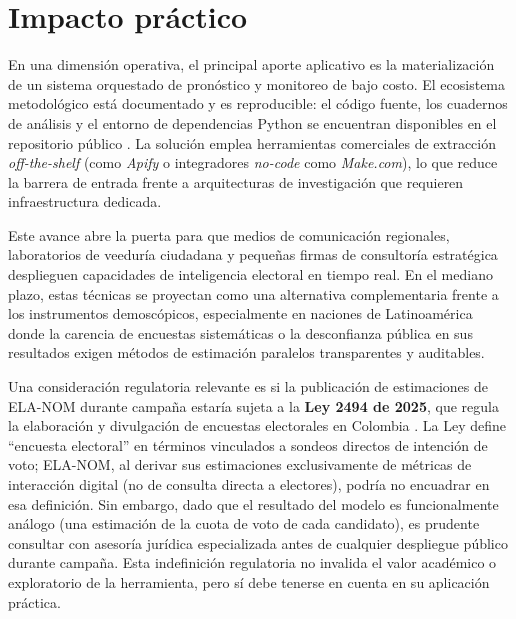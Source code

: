 \section{Impacto práctico}

En una dimensión operativa, el principal aporte aplicativo es la materialización de un sistema orquestado de pronóstico y monitoreo de bajo costo. El ecosistema metodológico está documentado y es reproducible: el código fuente, los cuadernos de análisis y el entorno de dependencias Python se encuentran disponibles en el repositorio público \parencite{sotelo2026elanom}. La solución emplea herramientas comerciales de extracción \textit{off-the-shelf} (como \textit{Apify} o integradores \textit{no-code} como \textit{Make.com}), lo que reduce la barrera de entrada frente a arquitecturas de investigación que requieren infraestructura dedicada.

Este avance abre la puerta para que medios de comunicación regionales, laboratorios de veeduría ciudadana y pequeñas firmas de consultoría estratégica desplieguen capacidades de inteligencia electoral en tiempo real. En el mediano plazo, estas técnicas se proyectan como una alternativa complementaria frente a los instrumentos demoscópicos, especialmente en naciones de Latinoamérica donde la carencia de encuestas sistemáticas o la desconfianza pública en sus resultados exigen métodos de estimación paralelos transparentes y auditables.

Una consideración regulatoria relevante es si la publicación de estimaciones de ELA-NOM durante campaña estaría sujeta a la \textbf{Ley 2494 de 2025}, que regula la elaboración y divulgación de encuestas electorales en Colombia \parencite{ley2494_2025}. La Ley define ``encuesta electoral'' en términos vinculados a sondeos directos de intención de voto; ELA-NOM, al derivar sus estimaciones exclusivamente de métricas de interacción digital (no de consulta directa a electores), podría no encuadrar en esa definición. Sin embargo, dado que el resultado del modelo es funcionalmente análogo (una estimación de la cuota de voto de cada candidato), es prudente consultar con asesoría jurídica especializada antes de cualquier despliegue público durante campaña. Esta indefinición regulatoria no invalida el valor académico o exploratorio de la herramienta, pero sí debe tenerse en cuenta en su aplicación práctica.

